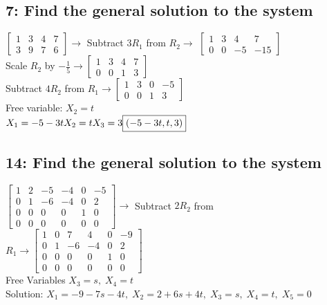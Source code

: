 \documentclass{article}
\begin{document}
\subsection*{7: Find the general solution to the system}
$
\left[\begin{array}{ccc|c}
    1 & 3 & 4 & 7 \\
    3 & 9 & 7 & 6
\end{array}\right]
\rightarrow$ Subtract $3R_1$ from $R_2 \rightarrow$
$
\left[\begin{array}{ccc|c}
    1 & 3 & 4 & 7 \\
    0 & 0 & -5 & -15
\end{array}\right]$ \\[0.1in] Scale $R_2$ by $-\frac{1}{5} \rightarrow
\left[\begin{array}{ccc|c}
    1 & 3 & 4 & 7 \\
    0 & 0 & 1 & 3
\end{array}\right]
$\\[0.1in] Subtract $4R_2$ from $R_1 \rightarrow
\left[\begin{array}{ccc|c}
    1 & 3 & 0 & -5 \\
    0 & 0 & 1 & 3
\end{array}\right]
$ \\[0.1in] Free variable: $X_2 = t$
\\$X_1=-5-3t \\ X_2 = t \\ X_3=3 \\ \boxed{(-5-3t, t, 3)}$ 
\subsection*{14: Find the general solution to the system}
$\left[\begin{array}{ccccc|c}
    1 & 2 & -5 & -4 & 0 & -5 \\
    0 & 1 & -6 & -4 & 0 & 2 \\
    0 & 0 & 0 & 0 & 1 & 0 \\
    0 & 0 & 0 & 0 & 0 & 0 
\end{array}\right] \rightarrow$ Subtract $2R_2$ from $R_1 \rightarrow
\left[\begin{array}{ccccc|c}
    1 & 0 & 7 & 4 & 0 & -9 \\
    0 & 1 & -6 & -4 & 0 & 2 \\
    0 & 0 & 0 & 0 & 1 & 0 \\
    0 & 0 & 0 & 0 & 0 & 0 
\end{array}\right]
$ \\[0.1in] Free Variables $X_3 = s, \; X_4=t$
\\Solution: $X_1 = -9-7s-4t, \; X_2 = 2+6s+4t, \; X_3 = s, \; X_4 = t, \; X_5 = 0$
\\[1.2mm] \pagebreak
\end{document}
